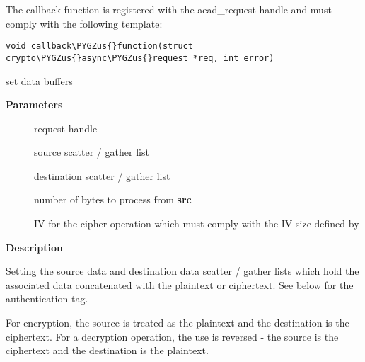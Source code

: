 \documentclass[a4paper,8pt,english]{sphinxmanual}
\def\PYGZus{\char`\_}
\begin{document}
The callback function is registered with the aead\_request handle and
must comply with the following template:

\begin{Verbatim}[commandchars=\\\{\}]
void callback\PYGZus{}function(struct crypto\PYGZus{}async\PYGZus{}request *req, int error)
\end{Verbatim}

\begin{fulllineitems}
\label{crypto/api-aead:c.aead_request_set_crypt}
set data buffers

\end{fulllineitems}


\textbf{Parameters}
\begin{description}
\item[{}] \leavevmode
request handle

\item[{}] \leavevmode
source scatter / gather list

\item[{}] \leavevmode
destination scatter / gather list

\item[{}] \leavevmode
number of bytes to process from \textbf{src}

\item[{}] \leavevmode
IV for the cipher operation which must comply with the IV size defined
by {\hyperref[crypto/api\string-aead:c.crypto_aead_ivsize]{\emph{}}}

\end{description}

\textbf{Description}

Setting the source data and destination data scatter / gather lists which
hold the associated data concatenated with the plaintext or ciphertext. See
below for the authentication tag.

For encryption, the source is treated as the plaintext and the
destination is the ciphertext. For a decryption operation, the use is
reversed - the source is the ciphertext and the destination is the plaintext.
\end{document}
